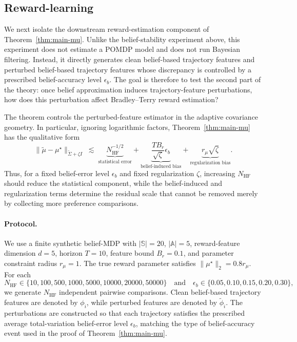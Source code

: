 \documentclass[10pt]{article} %
\theoremstyle{plain}
\theoremstyle{definition}
\theoremstyle{remark}
\newcommand{\bA}{\mathbb{A}}
\newcommand{\bS}{\mathbb{S}}
\begin{document}
\subsection{Reward-learning}
\label{subsec:exp-reward-learning}

We next isolate the downstream reward-estimation component of Theorem~\ref{thm:main-mu}. Unlike the belief-stability experiment above, this experiment does not estimate a POMDP model and does not run Bayesian filtering. Instead, it directly generates clean belief-based trajectory features and perturbed belief-based trajectory features whose discrepancy is controlled by a prescribed belief-accuracy level \(\epsilon_b\). The goal is therefore to test the second part of the theory: once belief approximation induces trajectory-feature perturbations, how does this perturbation affect Bradley--Terry reward estimation?

The theorem controls the perturbed-feature estimator in the adaptive covariance geometry. In particular, ignoring logarithmic factors, Theorem~\ref{thm:main-mu} has the qualitative form
\[
\|\tilde\mu-\mu^\star\|_{\tilde\Sigma+\zeta I}
\;\lesssim\;
\underbrace{N_{\mathrm{HF}}^{-1/2}}_{\text{statistical error}}
+
\underbrace{\frac{T B_r}{\sqrt{\zeta}}\epsilon_b}_{\text{belief-induced bias}}
+
\underbrace{r_\mu\sqrt{\zeta}}_{\text{regularization bias}} .
\]
Thus, for a fixed belief-error level \(\epsilon_b\) and fixed regularization \(\zeta\), increasing \(N_{\mathrm{HF}}\) should reduce the statistical component, while the belief-induced and regularization terms determine the residual scale that cannot be removed merely by collecting more preference comparisons.

\paragraph{Protocol.}
We use a finite synthetic belief-MDP with \(|\bS|=20\), \(|\bA|=5\), reward-feature dimension \(d=5\), horizon \(T=10\), feature bound \(B_r=0.1\), and parameter constraint radius \(r_\mu=1\). The true reward parameter satisfies \(\|\mu^\star\|_2=0.8r_\mu\). For each
\[
N_{\mathrm{HF}}\in\{10,100,500,1000,5000,10000,20000,50000\}
\quad\text{and}\quad
\epsilon_b\in\{0.05,0.10,0.15,0.20,0.30\},
\]
we generate \(N_{\mathrm{HF}}\) independent pairwise comparisons. Clean belief-based trajectory features are denoted by \(\phi_i\), while perturbed features are denoted by \(\tilde\phi_i\). The perturbations are constructed so that each trajectory satisfies the prescribed average total-variation belief-error level \(\epsilon_b\), matching the type of belief-accuracy event used in the proof of Theorem~\ref{thm:main-mu}.
\end{document}
